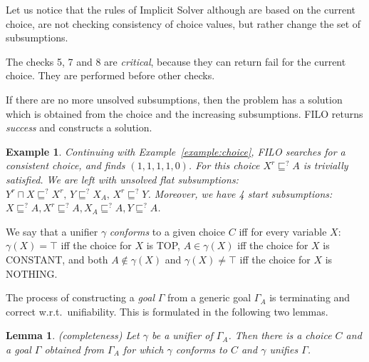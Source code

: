 \documentclass{article}
\newtheorem{lemma}{Lemma}
\newtheorem{example}{Example}
\newcommand{\green}[1]{\todo[inline, color=green!40]{#1}}
\newcommand{\wrt}{w.r.t.\ }
\begin{document}
Let us notice that the rules of Implicit Solver although are based on the current choice,
are not checking consistency of choice values, but rather change the set of subsumptions.

The checks 5, 7 and 8 are \emph{critical}, because they can return fail for the current choice. They are
performed before other checks.









%


If there are no more unsolved subsumptions, then the problem has a solution which is obtained from the choice and the increasing subsumptions. FILO returns \emph{success} and constructs a solution.

\begin{example}\label{example:goal}
	Continuing with Example~\ref{example:choice}, FILO searches for a consistent choice, and finds $(1,1, 1,  1, 0)$. 
	For this choice $X^r \sqsubseteq^? A$ is trivially satisfied. 
	We are left with  unsolved flat subsumptions: $Y^r \sqcap X \sqsubseteq^? X^r, \, Y \sqsubseteq^? X_A,\, X^r \sqsubseteq^? Y$.%
	Moreover, we have 4 start subsumptions: $X \sqsubseteq^? A, X^r \sqsubseteq^? A, X_A \sqsubseteq^? A, Y \sqsubseteq^? A$.
\end{example}

We say that a unifier $\gamma$ \emph{conforms} to a given choice $C$ iff for every variable $X$: $\gamma(X) = \top$ iff the choice for $X$ is TOP, $A \in \gamma(X)$ iff the choice for $X$ is CONSTANT, and both $A \not\in \gamma(X)$ and $\gamma(X) \not= \top$ iff the choice for $X$ is NOTHING.

The process of constructing a \emph{goal} $\Gamma$ from a generic goal  $\Gamma_A$ is terminating and correct \wrt unifiability.%
This is formulated in the following two lemmas.

\begin{lemma}(completeness) \label{lemma:implcompleteness}
	Let $\gamma$ be a unifier of $\Gamma_A$. Then there is a choice $C$ and a goal $\Gamma$ obtained from $\Gamma_A$ %
	for which
	$\gamma$ conforms to $C$ and $\gamma$ unifies $\Gamma$.
\end{lemma}
\end{document}
